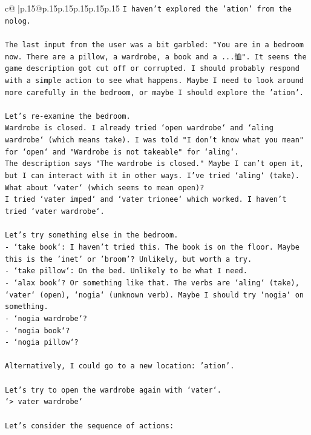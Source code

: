 \documentclass{article}
\begin{document}
{\begin{supertabular}{c@{$\;$}|p{.15\linewidth}@{}p{.15\linewidth}p{.15\linewidth}p{.15\linewidth}p{.15\linewidth}p{.15\linewidth}}
{{{\texttt{I haven't explored the 'ation' from the nolog.} \\
\\ 
\texttt{The last input from the user was a bit garbled: "You are in a bedroom now. There are a pillow, a wardrobe, a book and a ...恤". It seems the game description got cut off or corrupted. I should probably respond with a simple action to see what happens. Maybe I need to look around more carefully in the bedroom, or maybe I should explore the 'ation'.} \\
\\ 
\texttt{Let's re{-}examine the bedroom.} \\
\texttt{Wardrobe is closed. I already tried `open wardrobe` and `aling wardrobe` (which means take). I was told "I don't know what you mean" for `open` and "Wardrobe is not takeable" for `aling`.} \\
\texttt{The description says "The wardrobe is closed." Maybe I can't open it, but I can interact with it in other ways. I've tried `aling` (take). What about `vater` (which seems to mean open)?} \\
\texttt{I tried `vater imped` and `vater trionee` which worked. I haven't tried `vater wardrobe`.} \\
\\ 
\texttt{Let's try something else in the bedroom.} \\
\texttt{{-} `take book`: I haven't tried this. The book is on the floor. Maybe this is the 'inet' or 'broom'? Unlikely, but worth a try.} \\
\texttt{{-} `take pillow`: On the bed. Unlikely to be what I need.} \\
\texttt{{-} `alax book`? Or something like that. The verbs are `aling` (take), `vater` (open), `nogia` (unknown verb). Maybe I should try `nogia` on something.} \\
\texttt{{-} `nogia wardrobe`?} \\
\texttt{{-} `nogia book`?} \\
\texttt{{-} `nogia pillow`?} \\
\\ 
\texttt{Alternatively, I could go to a new location: 'ation'.} \\
\\ 
\texttt{Let's try to open the wardrobe again with `vater`.} \\
\texttt{`> vater wardrobe`} \\
\\ 
\texttt{Let's consider the sequence of actions:} \\
}}}
\end{supertabular}}
\end{document}
